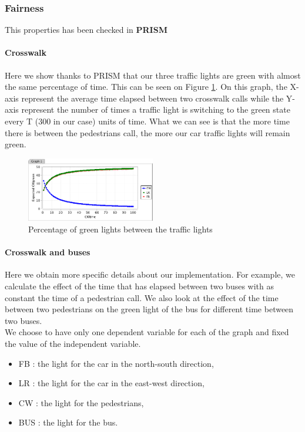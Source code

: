 \subsubsection{Fairness} \label{verif:fairness}

This properties has been checked in \textbf{PRISM}

\paragraph{Crosswalk}

Here we show thanks to PRISM that our three traffic lights are green with almost the same percentage of time. This can be seen on Figure \ref{fig:prism1}. On this graph, the X-axis represent the average time elapsed between two crosswalk calls while the Y-axis represent the number of times a traffic light is switching to the green state every T (300 in our case) units of time. What we can see is that the more time there is between the pedestrians call, the more our car traffic lights will remain green.

\begin{figure}[H]\label{fig:prism1}
  \centering
    \includegraphics[width=0.5\textwidth]{picture/graphprism.png}
    \caption{Percentage of green lights between the traffic lights}
\end{figure}

\paragraph{Crosswalk and buses}

Here we obtain more specific details about our implementation. For example, we calculate the effect of the time that has elapsed between two buses with as constant the time of a pedestrian call. We also look at the effect of the time between two pedestrians on the green light of the bus for different time between two buses. \\

We choose to have only one dependent variable for each of the graph and fixed the value of the independent variable.
\begin{itemize}
	\item FB : the light for the car in the north-south direction,
	\item LR : the light for the car in the east-west direction,
	\item CW : the light for the pedestrians,
	\item BUS : the light for the bus.
\end{itemize}


